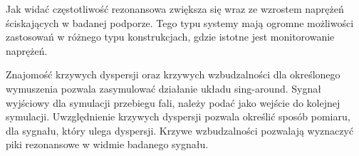 Jak widać częstotliwość rezonansowa zwiększa się wraz ze wzrostem naprężeń ściskających w badanej podporze. Tego typu systemy mają ogromne możliwości zastosowań w różnego typu konstrukcjach, gdzie istotne jest monitorowanie naprężeń.

Znajomość krzywych dyspersji oraz krzywych wzbudzalności dla określonego wymuszenia pozwala zasymulować działanie układu sing-around. Sygnał wyjściowy dla symulacji przebiegu fali, należy podać jako wejście do kolejnej symulacji. Uwzględnienie krzywych dyspersji pozwala określić sposób pomiaru, dla sygnału, który ulega dyspersji. Krzywe wzbudzalności pozwalają wyznaczyć piki rezonansowe w widmie badanego sygnału.

